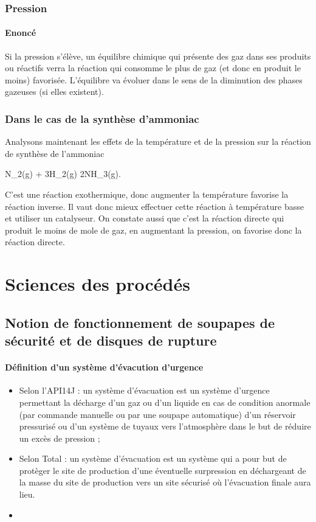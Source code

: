 \subsubsection{Pression}
\paragraph{Enoncé}
Si la pression s'élève, un équilibre chimique qui
présente des gaz dans ses produits ou réactifs verra la réaction
qui consomme le plus de gaz (et donc en produit le moins)
favorisée. L'équilibre va évoluer dans le sens de la diminution
des phases gazeuses (si elles existent).
\subsubsection{Dans le cas de la synthèse d'ammoniac}
Analysons maintenant les effets de la température et
de la pression sur la réaction de synthèse de l'ammoniac
\begin{chemmath}
	N_2(g) + 3H_2(g) \Leftrightarrow 2NH_3(g).
\end{chemmath}
C'est une réaction exothermique, donc augmenter
la température favorise la réaction inverse. Il vaut
donc mieux effectuer cette réaction à température
basse et utiliser un catalyseur.
On constate aussi que c'est la réaction directe qui
produit le moins de mole de gaz, en augmentant la
pression, on favorise donc la réaction directe.

\section{Sciences des procédés}
\subsection{Notion de fonctionnement de soupapes de sécurité et de disques de rupture}
\paragraph{Définition d'un système d'évacution d'urgence}
\begin{itemize}
	\item	Selon l'API14J : un système d'évacuation est un système
	d'urgence permettant la décharge d'un gaz ou d'un liquide en cas
	de condition anormale (par commande manuelle ou par une soupape
	automatique) d'un réservoir pressurisé ou d'un système de tuyaux
	vers l'atmosphère dans le but de réduire un excès de pression ;
	\item Selon Total : un système d'évacuation est un système qui
	a pour but de protèger le site de production d'une éventuelle
	surpression en déchargeant de la masse du site de production
	vers un site sécurisé où l'évacuation finale aura lieu.
	\item
\end{itemize}

